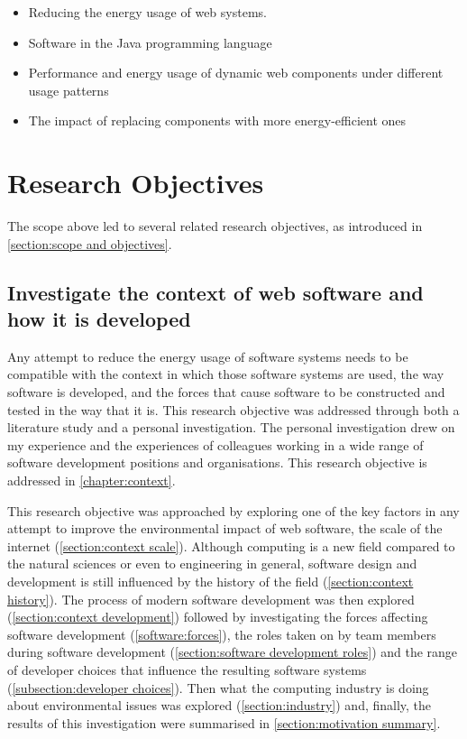 \begin{itemize}
    \item Reducing the energy usage of web systems.
    \item Software in the Java \gls{programming language}
    \item Performance and energy usage of dynamic web components under different usage patterns
    \item The impact of replacing components with more energy-efficient ones
\end{itemize}

\section{Research Objectives}
\label{section:research objectives}

The scope above led to several related research objectives, as introduced in \autoref{section:scope and objectives}.

\subsection{Investigate the context of web software and how it is developed}

Any attempt to reduce the energy usage of software systems needs to be compatible with the context in which those software systems are used, the way software is developed, and the forces that cause software to be constructed and tested in the way that it is. This research objective was addressed through both a literature study and a personal investigation. The personal investigation drew on my experience and the experiences of colleagues working in a wide range of software development positions and organisations. This research objective is addressed in \autoref{chapter:context}.

This research objective was approached by exploring one of the key factors in any attempt to improve the environmental impact of web software, the scale of the internet (\autoref{section:context scale}). Although computing is a new field compared to the natural sciences or even to engineering in general, software design and development is still influenced by the history of the field (\autoref{section:context history}). The process of modern software development was then explored (\autoref{section:context development}) followed by investigating the forces affecting software development (\autoref{software:forces}), the roles taken on by team members during software development (\autoref{section:software development roles}) and the range of developer choices that influence the resulting software systems (\autoref{subsection:developer choices}). Then what the computing industry is doing about environmental issues was explored (\autoref{section:industry}) and, finally, the results of this investigation were summarised in \autoref{section:motivation summary}.

